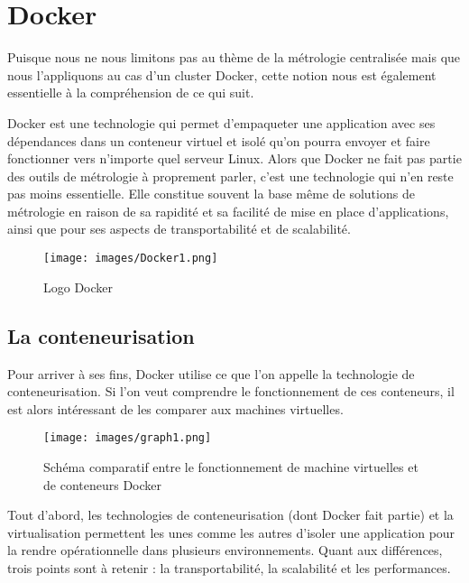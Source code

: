 \documentclass[oneside,12pt]{report}
\begin{document}
\chapter{Docker}

Puisque nous ne nous limitons pas au thème de la métrologie centralisée mais que nous l'appliquons au cas d'un cluster Docker, cette notion nous est également essentielle à la compréhension de ce qui suit.\newline

Docker est une technologie qui permet d'empaqueter une application avec ses dépendances dans un conteneur virtuel et isolé qu'on pourra envoyer et faire fonctionner vers n'importe quel serveur Linux.  Alors que Docker ne fait pas partie des outils de métrologie à proprement parler, c'est une technologie qui n'en reste pas moins essentielle. Elle constitue souvent la base même de solutions de métrologie en raison de sa rapidité et sa facilité de mise en place d'applications, ainsi que pour ses aspects de transportabilité et de scalabilité.

\begin{figure}[!ht]
    \centering
    \texttt{[image: images/Docker1.png]}
    \caption{Logo Docker}
    \label{fig:mesh1}
\end{figure}

\section{La conteneurisation}

Pour arriver à ses fins, Docker utilise ce que l'on appelle la technologie de conteneurisation. Si l'on veut comprendre le fonctionnement de ces conteneurs, il est alors intéressant de les comparer aux machines virtuelles.

\begin{figure}[H]
    \centering
    \texttt{[image: images/graph1.png]}
    \caption{Schéma comparatif entre le fonctionnement de machine virtuelles et de conteneurs Docker}
    \label{fig:mesh1}
\end{figure}

Tout d'abord, les technologies de conteneurisation (dont Docker fait partie) et la virtualisation permettent les unes comme les autres d'isoler une application pour la rendre opérationnelle dans plusieurs environnements. Quant aux différences, trois points sont à retenir : la transportabilité, la scalabilité et les performances.\newline
\end{document}
